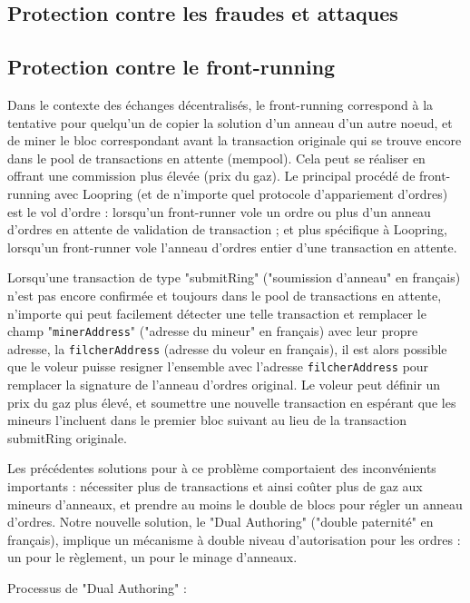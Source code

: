 \documentclass[UTF8,nofonts]{article}
\begin{document}
\begin{multicols}{2}
\section{Protection contre les fraudes et attaques}

\subsection{Protection contre le front-running\label{sec:dual_authoring}}

Dans le contexte des échanges décentralisés, le front-running correspond à la tentative pour quelqu'un de copier la solution d'un anneau d'un autre noeud, et de miner le bloc correspondant avant la transaction originale qui se trouve encore dans le pool de transactions en attente (mempool). Cela peut se réaliser en offrant une commission plus élevée (prix du gaz). Le principal procédé de front-running avec Loopring (et de n'importe quel protocole d'appariement d'ordres) est le vol d'ordre : lorsqu'un front-runner vole un ordre ou plus d'un anneau d'ordres en attente de validation de transaction ; et plus spécifique à Loopring, lorsqu'un front-runner vole l'anneau d'ordres entier d'une transaction en attente. 

Lorsqu'une transaction de type "submitRing" ("soumission d'anneau" en français) n'est pas encore confirmée et toujours dans le pool de transactions en attente, n'importe qui peut facilement détecter une telle transaction et remplacer le champ "\verb|minerAddress|" ("adresse du mineur" en français) avec leur propre adresse, la \verb|filcherAddress| (adresse du voleur en français), il est alors possible que le voleur puisse resigner l'ensemble avec l'adresse \verb|filcherAddress| pour remplacer la signature de l'anneau d'ordres original. Le voleur peut définir un prix du gaz plus élevé, et soumettre une nouvelle transaction en espérant que les mineurs l'incluent dans le premier bloc suivant au lieu de la transaction submitRing originale.

Les précédentes solutions pour à ce problème comportaient des inconvénients importants : nécessiter plus de transactions et ainsi coûter plus de gaz aux mineurs d'anneaux, et prendre au moins le double de blocs pour régler un anneau d'ordres. Notre nouvelle solution, le "Dual Authoring" \cite{dualauthor} ("double paternité" en français), implique un mécanisme à double niveau d'autorisation pour les ordres : un pour le règlement, un pour le minage d'anneaux. 

Processus de "Dual Authoring" :


\end{multicols}
\end{document}

